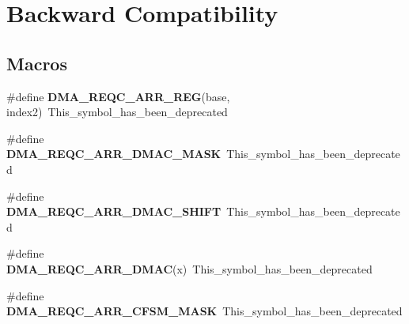 \hypertarget{group___backward___compatibility___symbols}{}\section{Backward Compatibility}
\label{group___backward___compatibility___symbols}
\subsection*{Macros}
\begin{DoxyCompactItemize}
\item 
\mbox{\label{group___backward___compatibility___symbols_gaaf86e5770af62c08d70a8808bfab9d92}} 
\#define {\bfseries D\+M\+A\+\_\+\+R\+E\+Q\+C\+\_\+\+A\+R\+R\+\_\+\+R\+EG}(base,  index2)~This\+\_\+symbol\+\_\+has\+\_\+been\+\_\+deprecated
\item 
\mbox{\label{group___backward___compatibility___symbols_ga8e9317db9c352716b95281ed740c533e}} 
\#define {\bfseries D\+M\+A\+\_\+\+R\+E\+Q\+C\+\_\+\+A\+R\+R\+\_\+\+D\+M\+A\+C\+\_\+\+M\+A\+SK}~This\+\_\+symbol\+\_\+has\+\_\+been\+\_\+deprecated
\item 
\mbox{\label{group___backward___compatibility___symbols_gabcd06f16caa331a970dac85d4d707107}} 
\#define {\bfseries D\+M\+A\+\_\+\+R\+E\+Q\+C\+\_\+\+A\+R\+R\+\_\+\+D\+M\+A\+C\+\_\+\+S\+H\+I\+FT}~This\+\_\+symbol\+\_\+has\+\_\+been\+\_\+deprecated
\item 
\mbox{\label{group___backward___compatibility___symbols_ga084dca5e32360d1b1c4568f5e0d75c0f}} 
\#define {\bfseries D\+M\+A\+\_\+\+R\+E\+Q\+C\+\_\+\+A\+R\+R\+\_\+\+D\+M\+AC}(x)~This\+\_\+symbol\+\_\+has\+\_\+been\+\_\+deprecated
\item 
\mbox{\label{group___backward___compatibility___symbols_gaa28ab53f19cb06ff7ab8a03dfc646355}} 
\#define {\bfseries D\+M\+A\+\_\+\+R\+E\+Q\+C\+\_\+\+A\+R\+R\+\_\+\+C\+F\+S\+M\+\_\+\+M\+A\+SK}~This\+\_\+symbol\+\_\+has\+\_\+been\+\_\+deprecated
\item 
\mbox{\label{group___backward___compatibility___symbols_ga7130ea81cb843080f9c2ec4e537cd81c}} 

\end{DoxyCompactItemize}

